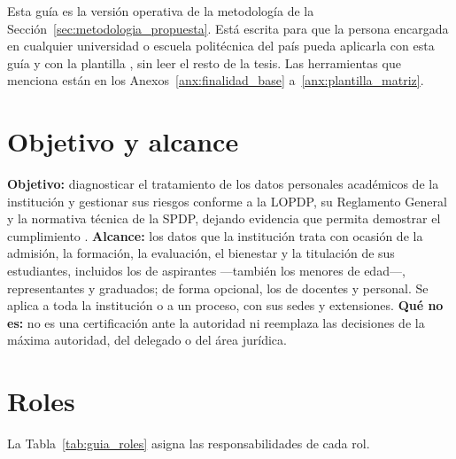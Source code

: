 \label{anx:guia_aplicacion}

Esta guía es la versión operativa de la metodología de la Sección~\ref{sec:metodologia_propuesta}. Está escrita para que la persona encargada en cualquier universidad o escuela politécnica del país pueda aplicarla con esta guía y con la plantilla , sin leer el resto de la tesis. Las herramientas que menciona están en los Anexos~\ref{anx:finalidad_base} a~\ref{anx:plantilla_matriz}.

\section{Objetivo y alcance}

\textbf{Objetivo:} diagnosticar el tratamiento de los datos personales académicos de la institución y gestionar sus riesgos conforme a la LOPDP, su Reglamento General y la normativa técnica de la SPDP, dejando evidencia que permita demostrar el cumplimiento \cite[arts.~10, lit.~k, 40, 42 y 47]{lopdp2021}. \textbf{Alcance:} los datos que la institución trata con ocasión de la admisión, la formación, la evaluación, el bienestar y la titulación de sus estudiantes, incluidos los de aspirantes ---también los menores de edad---, representantes y graduados; de forma opcional, los de docentes y personal. Se aplica a toda la institución o a un proceso, con sus sedes y extensiones. \textbf{Qué no es:} no es una certificación ante la autoridad ni reemplaza las decisiones de la máxima autoridad, del delegado o del área jurídica.

\section{Roles}

La Tabla~\ref{tab:guia_roles} asigna las responsabilidades de cada rol.

